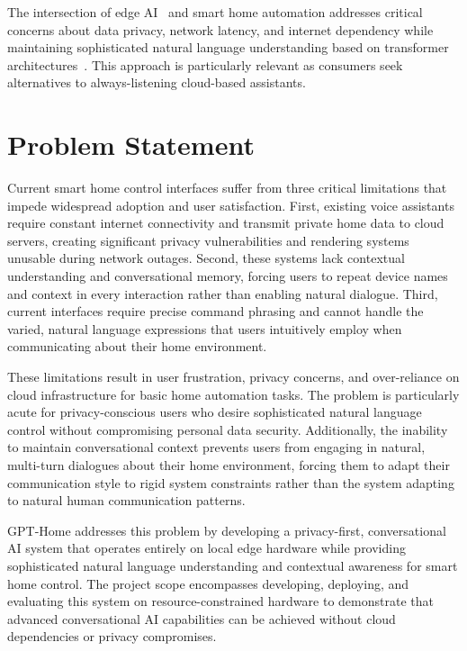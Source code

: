 \documentclass[12pt]{article}
\begin{document}
The intersection of edge AI~\cite{shi2016edge} and smart home automation addresses critical concerns about data privacy, network latency, and internet dependency while maintaining sophisticated natural language understanding based on transformer architectures~\cite{vaswani2017attention}. This approach is particularly relevant as consumers seek alternatives to always-listening cloud-based assistants.

\section{Problem Statement}

Current smart home control interfaces suffer from three critical limitations that impede widespread adoption and user satisfaction. First, existing voice assistants require constant internet connectivity and transmit private home data to cloud servers, creating significant privacy vulnerabilities and rendering systems unusable during network outages. Second, these systems lack contextual understanding and conversational memory, forcing users to repeat device names and context in every interaction rather than enabling natural dialogue. Third, current interfaces require precise command phrasing and cannot handle the varied, natural language expressions that users intuitively employ when communicating about their home environment.

These limitations result in user frustration, privacy concerns, and over-reliance on cloud infrastructure for basic home automation tasks. The problem is particularly acute for privacy-conscious users who desire sophisticated natural language control without compromising personal data security. Additionally, the inability to maintain conversational context prevents users from engaging in natural, multi-turn dialogues about their home environment, forcing them to adapt their communication style to rigid system constraints rather than the system adapting to natural human communication patterns.

GPT-Home addresses this problem by developing a privacy-first, conversational AI system that operates entirely on local edge hardware while providing sophisticated natural language understanding and contextual awareness for smart home control. The project scope encompasses developing, deploying, and evaluating this system on resource-constrained hardware to demonstrate that advanced conversational AI capabilities can be achieved without cloud dependencies or privacy compromises.
\end{document}
